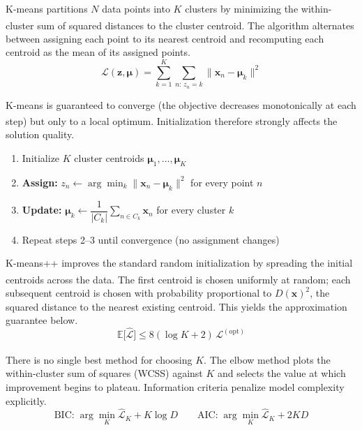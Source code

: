 \begin{tcbitemize}[ skin=sectionraster ]
    \tcbitem[title=K-Means Objective, raster multicolumn=3]
    K-means partitions $N$ data points into $K$ clusters by minimizing the within-cluster sum of squared distances to the cluster centroid\textsuperscript{\cite[][p.166]{iiiCourseMachineLearning}}. The algorithm alternates between assigning each point to its nearest centroid and recomputing each centroid as the mean of its assigned points.
    \tcblower
    \begin{equation}
        \mathcal{L}(\mathbf{z}, \boldsymbol{\mu}) = \sum_{k=1}^{K} \sum_{n:\, z_n = k} \|\mathbf{x}_n - \boldsymbol{\mu}_k\|^2
    \end{equation}

    \tcbitem[title=K-Means Algorithm, raster multicolumn=3]
    K-means is guaranteed to converge (the objective decreases monotonically at each step) but only to a local optimum\textsuperscript{\cite[][pp.~166--168]{iiiCourseMachineLearning}}. Initialization therefore strongly affects the solution quality.
    \tcblower
    \begin{enumerate}
        \item Initialize $K$ cluster centroids $\boldsymbol{\mu}_1, \ldots, \boldsymbol{\mu}_K$
        \item \textbf{Assign:} $z_n \leftarrow \arg\min_k \|\mathbf{x}_n - \boldsymbol{\mu}_k\|^2$ for every point $n$
        \item \textbf{Update:} $\boldsymbol{\mu}_k \leftarrow \dfrac{1}{|C_k|}\displaystyle\sum_{n \in C_k} \mathbf{x}_n$ for every cluster $k$
        \item Repeat steps 2--3 until convergence (no assignment changes)
    \end{enumerate}

    \tcbitem[title=K-Means++ Initialization, raster multicolumn=3]
    K-means++ improves the standard random initialization by spreading the initial centroids across the data\textsuperscript{\cite[][pp.~168--169]{iiiCourseMachineLearning}}. The first centroid is chosen uniformly at random; each subsequent centroid is chosen with probability proportional to $D(\mathbf{x})^2$, the squared distance to the nearest existing centroid. This yields the approximation guarantee below.
    \tcblower
    \begin{equation}
        \mathbb{E}\bigl[\hat{\mathcal{L}}\bigr] \leq 8(\log K + 2)\,\mathcal{L}^{(\mathrm{opt})}
    \end{equation}

    \tcbitem[title={Choosing K: Elbow Method and Information Criteria}, raster multicolumn=3]
    There is no single best method for choosing $K$\textsuperscript{\cite[][p.169]{iiiCourseMachineLearning}}. The elbow method plots the within-cluster sum of squares (WCSS) against $K$ and selects the value at which improvement begins to plateau. Information criteria penalize model complexity explicitly.
    \tcblower
    \begin{equation}
        \text{BIC:}\; \arg\min_K \hat{\mathcal{L}}_K + K\log D
        \qquad
        \text{AIC:}\; \arg\min_K \hat{\mathcal{L}}_K + 2KD
    \end{equation}
\end{tcbitemize}

